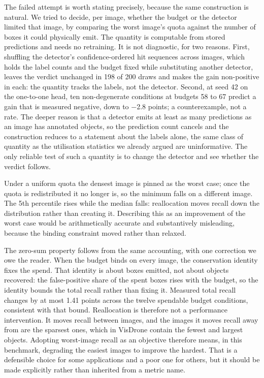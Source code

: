 \documentclass[sn-mathphys,Numbered]{sn-jnl}
\begin{document}
The failed attempt is worth stating precisely, because the same construction is natural. We tried to decide, per image, whether the budget or the detector limited that image, by comparing the worst image's quota against the number of boxes it could physically emit. The quantity is computable from stored predictions and needs no retraining. It is not diagnostic, for two reasons. First, shuffling the detector's confidence-ordered hit sequences across images, which holds the label counts and the budget fixed while substituting another detector, leaves the verdict unchanged in 198 of 200 draws and makes the gain non-positive in each: the quantity tracks the labels, not the detector. Second, at seed 42 on the one-to-one head, ten non-degenerate conditions at budgets 58 to 67 predict a gain that is measured negative, down to $-$2.8 points; a counterexample, not a rate. The deeper reason is that a detector emits at least as many predictions as an image has annotated objects, so the prediction count cancels and the construction reduces to a statement about the labels alone, the same class of quantity as the utilisation statistics we already argued are uninformative. The only reliable test of such a quantity is to change the detector and see whether the verdict follows.

Under a uniform quota the densest image is pinned as the worst case; once the quota is redistributed it no longer is, so the minimum falls on a different image.  The 5th percentile rises while the median falls: reallocation moves recall down the distribution rather than creating it. Describing this as an improvement of the worst case would be arithmetically accurate and substantively misleading, because the binding constraint moved rather than relaxed.

The zero-sum property follows from the same accounting, with one correction we owe the reader. When the budget binds on every image, the conservation identity fixes the spend. That identity is about boxes emitted, not about objects recovered: the false-positive share of the spent boxes rises with the budget, so the identity bounds the total recall rather than fixing it. Measured total recall changes by at most 1.41 points across the twelve spendable budget conditions, consistent with that bound. Reallocation is therefore not a performance intervention. It moves recall between images, and the images it moves recall away from are the sparsest ones, which in VisDrone contain the fewest and largest objects. Adopting worst-image recall as an objective therefore means, in this benchmark, degrading the easiest images to improve the hardest. That is a defensible choice for some applications and a poor one for others, but it should be made explicitly rather than inherited from a metric name.
\end{document}

